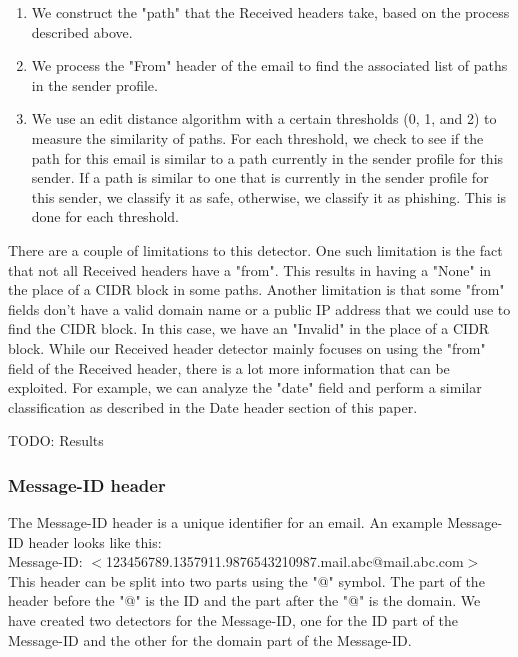 \documentclass[letterpaper]{article}
\begin{document}
\begin{enumerate}
\item We construct the "path" that the Received headers take, based on the process described above.
\item We process the "From" header of the email to find the associated list of paths in the sender profile.
\item We use an edit distance algorithm with a certain thresholds (0, 1, and 2) to measure the similarity of paths. For each threshold, we check to see if the path for this email is similar to a path currently in the sender profile for this sender. If a path is similar to one that is currently in the sender profile for this sender, we classify it as safe, otherwise, we classify it as phishing. This is done for each threshold. 
\end{enumerate}

There are a couple of limitations to this detector. One such limitation is the fact that not all Received headers have a "from". This results in having a "None" in the place of a CIDR block in some paths. Another limitation is that some "from" fields don't have a valid domain name or a public IP address that we could use to find the CIDR block. In this case, we have an "Invalid" in the place of a CIDR block. While our Received header detector mainly focuses on using the "from" field of the Received header, there is a lot more information that can be exploited. For example, we can analyze the "date" field and perform a similar classification as described in the Date header section of this paper.

TODO: Results

\subsubsection{Message-ID header}

The Message-ID header is a unique identifier for an email. An example Message-ID header looks like this:\\

Message-ID: $<$123456789.1357911.9876543210987.mail.abc@mail.abc.com$>$\\

This header can be split into two parts using the "@" symbol. The part of the header before the "@" is the ID and the part after the "@" is the domain. We have created two detectors for the Message-ID, one for the ID part of the Message-ID and the other for the domain part of the Message-ID.\\
\end{document}
